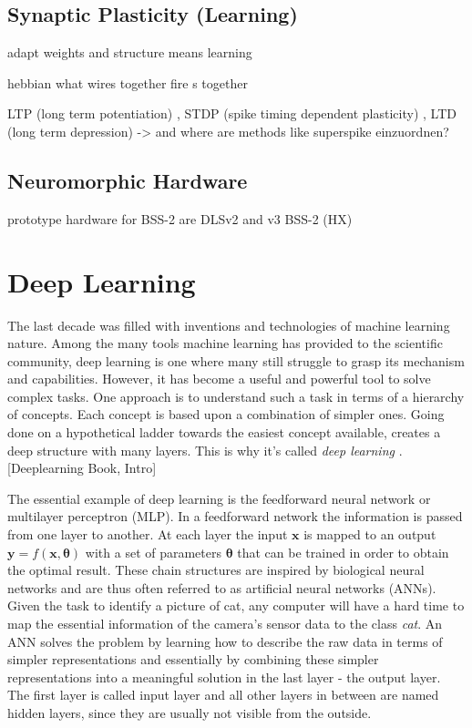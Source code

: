 \subsection{Synaptic Plasticity (Learning)}
adapt weights and structure means learning

hebbian what wires together fire s together

LTP (long term potentiation) , STDP (spike timing dependent plasticity) , LTD (long term depression) -> and where are methods like superspike einzuordnen?


\subsection{Neuromorphic Hardware}



prototype hardware for BSS-2 are DLSv2 and v3
BSS-2 (HX)



\section{Deep Learning}
\label{deeplearning}
The last decade was filled with inventions and technologies of machine learning nature. Among the many tools machine learning has provided to the scientific community, deep learning is one where many still struggle to grasp its mechanism and capabilities. However, it has become a useful and powerful tool to solve complex tasks. One approach is to understand such a task in terms of a hierarchy of concepts. Each concept is based upon a combination of simpler ones. Going done on a hypothetical ladder towards the easiest concept available, creates a deep structure with many layers. This is why it's called \textit{deep learning} . [Deeplearning Book, Intro]

The essential example of deep learning is the feedforward neural network or multilayer perceptron (MLP). In a feedforward network the information is passed from one layer to another. At each layer the input $\mathbf{x}$ is mapped to an output $\mathbf{y} = f(\mathbf{x, \theta})$ with a set of parameters $\mathbf{\theta}$ that can be trained in order to obtain the optimal result. These chain structures are inspired by biological neural networks and are thus often referred to as artificial neural networks (ANNs).\\

Given the task to identify a picture of cat, any computer will have a hard time to map the essential information of the camera's sensor data to the class \textit{cat}. An ANN solves the problem by learning how to describe the raw data in terms of simpler representations and essentially by combining these simpler representations into a meaningful solution in the last layer - the output layer. The first layer is called input layer and all other layers in between are named hidden layers, since they are usually not visible from the outside.\\

